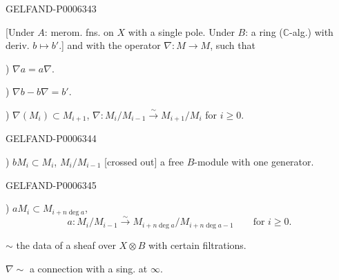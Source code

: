 \begin{GelfandAdjacentEvidence}{GELFAND-P000634}{3}

[Under \(A\): merom. fns. on \(X\) with a single pole.
Under \(B\): a ring (\(\mathbb C\)-alg.) with deriv. \(b\mapsto b'\).]
and with the operator \(\nabla:M\to M\), such that

) \(\nabla a=a\nabla\).

) \(\nabla b-b\nabla=b'\).

) \(\nabla(M_i)\subset M_{i+1}\),
\(\nabla:M_i/M_{i-1}\overset{\sim}{\to} M_{i+1}/M_i\)
for \(i\geqslant0\).
\end{GelfandAdjacentEvidence}
\begin{GelfandAdjacentEvidence}{GELFAND-P000634}{4}


) \(bM_i\subset M_i\), \(M_i/M_{i-1}\) [crossed out]
a free \(B\)-module with one generator.
\end{GelfandAdjacentEvidence}
\begin{GelfandAdjacentEvidence}{GELFAND-P000634}{5}


) \(aM_i\subset M_{i+n\operatorname{deg}a}\),
\[
a:M_i/M_{i-1}\overset{\sim}{\to}
M_{i+n\operatorname{deg}a}/M_{i+n\operatorname{deg}a-1}
\qquad\text{for }i\geqslant0.
\]
\end{GelfandAdjacentEvidence}


\(\sim\) the data of a sheaf over \(X\otimes B\) with certain filtrations.

\(\nabla\sim\) a connection with a sing. at \(\infty\).
\begin{center}\textemdash\,\textperiodcentered\,\textemdash\end{center}


